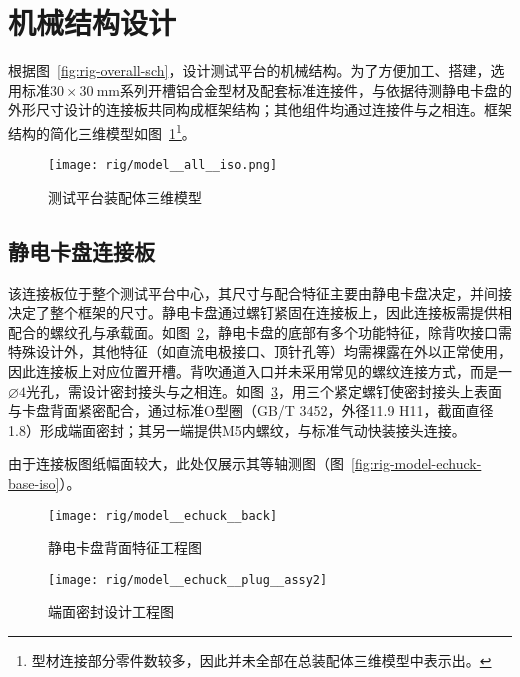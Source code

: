 \clearpage



\section{机械结构设计}\label{sec:rig-model}

根据图~\ref{fig:rig-overall-sch}，设计测试平台的机械结构。为了方便加工、搭建，选用标准$\num{30} \times \SI{30}{\mm}$系列开槽铝合金型材及配套标准连接件，与依据待测静电卡盘的外形尺寸设计的连接板共同构成框架结构；其他组件均通过连接件与之相连。框架结构的简化三维模型如图~\ref{fig:rig-model-all-iso}\footnote{型材连接部分零件数较多，因此并未全部在总装配体三维模型中表示出。}。

\begin{figure}[p]
\centering
\texttt{[image: rig/model\_\_all\_\_iso.png]}
\caption{测试平台装配体三维模型}
\label{fig:rig-model-all-iso}
\end{figure}


\subsection{静电卡盘连接板}\label{sec:rig-model-base}

该连接板位于整个测试平台中心，其尺寸与配合特征主要由静电卡盘决定，并间接决定了整个框架的尺寸。静电卡盘通过螺钉紧固在连接板上，因此连接板需提供相配合的螺纹孔与承载面。如图~\ref{fig:rig-model-echuck-back}\footnotemark{}，静电卡盘的底部有多个功能特征，除背吹接口需特殊设计外，其他特征（如直流电极接口、顶针孔等）均需裸露在外以正常使用，因此连接板上对应位置开槽。背吹通道入口并未采用常见的螺纹连接方式，而是一$\diameter{}4$光孔，需设计密封接头与之相连。如图~\ref{fig:rig-model-echuck-plug-assy}，用三个紧定螺钉使密封接头上表面与卡盘背面紧密配合，通过标准O型圈（GB/T 3452，外径11.9 H11，截面直径1.8）形成端面密封；其另一端提供M5内螺纹，与标准气动快装接头连接。

由于连接板图纸幅面较大，此处仅展示其等轴测图（图~\ref{fig:rig-model-echuck-base-iso}）。


\begin{figure}[p]
\centering
\texttt{[image: rig/model\_\_echuck\_\_back]}
\caption{静电卡盘背面特征工程图}
\label{fig:rig-model-echuck-back}
\end{figure}

\begin{figure}[p]
\centering
\texttt{[image: rig/model\_\_echuck\_\_plug\_\_assy2]}
\caption{端面密封设计工程图}
\label{fig:rig-model-echuck-plug-assy}
\end{figure}

